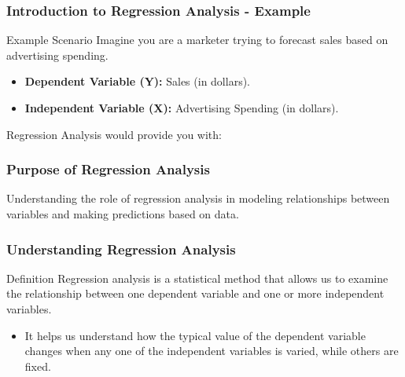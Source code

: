 \documentclass{beamer}
\begin{document}
\begin{frame}[fragile]
    \frametitle{Introduction to Regression Analysis - Example}
    \begin{block}{Example Scenario}
        Imagine you are a marketer trying to forecast sales based on advertising spending.
        \begin{itemize}
            \item \textbf{Dependent Variable (Y):} Sales (in dollars).
            \item \textbf{Independent Variable (X):} Advertising Spending (in dollars).
        \end{itemize}
        
        Regression Analysis would provide you with:
    \end{block}
\end{frame}

\begin{frame}[fragile]
    \frametitle{Purpose of Regression Analysis}
    Understanding the role of regression analysis in modeling relationships between variables and making predictions based on data.
\end{frame}

\begin{frame}[fragile]
    \frametitle{Understanding Regression Analysis}
    
    \begin{block}{Definition}
        Regression analysis is a statistical method that allows us to examine the relationship between one dependent variable and one or more independent variables. 
    \end{block}
    
    \begin{itemize}
        \item It helps us understand how the typical value of the dependent variable changes when any one of the independent variables is varied, while others are fixed.
    \end{itemize}
\end{frame}
\end{document}
